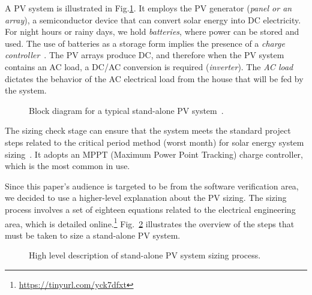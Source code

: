 \documentclass[10pt,journal,compsoc]{IEEEtran}
\begin{document}
A PV system is illustrated in Fig.\ref{fig:blockdiagram}. It employs the PV generator (\textit{panel or an array}), a semiconductor device that can convert solar energy into DC electricity. For night hours or rainy days, we hold \textit{batteries}, where power can be stored and used. The use of batteries as a storage form implies the presence of a \textit{charge controller}~\cite{Hansen}. The PV arrays produce DC, and therefore when the PV system contains an AC load, a DC/AC conversion is required (\textit{inverter}). The \textit{AC load} dictates the behavior of the AC electrical load from the house that will be fed by the system.
%
\begin{figure}[h]
\centering
\caption{Block diagram for a typical stand-alone PV system~\cite{Hansen}.}
\label{fig:blockdiagram} 
\end{figure}

The sizing check stage can ensure that the system meets the standard project steps related to the critical period method (worst month) for solar energy system sizing~\cite{Pinho}. It adopts an MPPT (Maximum Power Point Tracking) charge controller, which is the most common in use. 

Since this paper's audience is targeted to be from the software verification area, we decided to use a higher-level explanation about the PV sizing. The sizing process involves a set of eighteen equations related to the electrical engineering area, which is detailed online.\footnote{\url{https://tinyurl.com/yck7dfxt}} Fig.~\ref{fig:flow} illustrates the overview of the steps that must be taken to size a stand-alone PV system.
%
\begin{figure}[h]
\centering
\caption{High level description of stand-alone PV system sizing process.}
\label{fig:flow} 
\end{figure}
\end{document}
